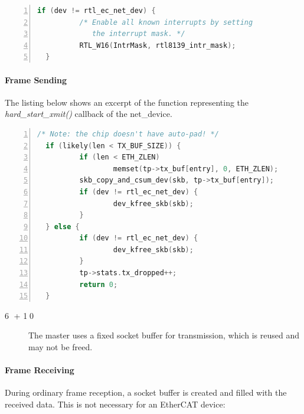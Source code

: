 \documentclass[a4paper,12pt,BCOR6mm,bibtotoc,idxtotoc]{scrbook}
\newcommand{\linenum}[1]{\normalfont\textcircled{\tiny #1}}
\begin{document}
\begin{lstlisting}[gobble=2,language=C,numbers=left]
  if (dev != rtl_ec_net_dev) {
          /* Enable all known interrupts by setting
             the interrupt mask. */
          RTL_W16(IntrMask, rtl8139_intr_mask);
  }
\end{lstlisting}

\paragraph{Frame Sending}

The listing below shows an excerpt of the function representing the
\textit{hard\_start\_xmit()} callback of the net\_device.

\begin{lstlisting}[gobble=2,language=C,numbers=left]
  /* Note: the chip doesn't have auto-pad! */
  if (likely(len < TX_BUF_SIZE)) {
          if (len < ETH_ZLEN)
                  memset(tp->tx_buf[entry], 0, ETH_ZLEN);
          skb_copy_and_csum_dev(skb, tp->tx_buf[entry]);
          if (dev != rtl_ec_net_dev) {
                  dev_kfree_skb(skb);
          }
  } else {
          if (dev != rtl_ec_net_dev) {
                  dev_kfree_skb(skb);
          }
          tp->stats.tx_dropped++;
          return 0;
  }
\end{lstlisting}

\begin{description}
\item[\linenum{6} + \linenum{10}] The
  master uses a fixed socket buffer for transmission, which is reused
  and may not be freed.
\end{description}

\paragraph{Frame Receiving}

During ordinary frame reception, a socket buffer is created and filled
with the received data. This is not necessary for an EtherCAT device:
\end{document}

